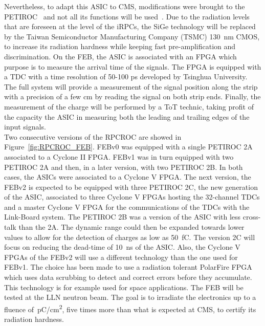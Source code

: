 	Nevertheless, to adapt this ASIC to CMS, modifications were brought to the PETIROC~\cite{PHASEIITP} and not all its functions will be used~\cite{COMBARET2018}. Due to the radiation levels that are foreseen at the level of the iRPCs, the SiGe technology will be replaced by the Taiwan Semiconductor Manufacturing Company (TSMC) \SI{130}{nm} CMOS, to increase its radiation hardness while keeping fast pre-amplification and discrimination. On the \acl{FEB}, the ASIC is associated with an FPGA which purpose is to measure the arrival time of the signals. The FPGA is equipped with a TDC with a time resolution of 50-100 \si{ps} developed by Tsinghua University. The full system will provide a measurement of the signal position along the strip with a precision of a few \si{cm} by reading the signal on both strip ends. Finally, the measurement of the charge will be performed by a \acf{ToT} technic, taking profit of the capacity the ASIC in measuring both the leading and trailing edges of the input signals.\\
	Two consecutive versions of the RPCROC are showed in Figure~\ref{fig:RPCROC_FEB}. FEBv0 was equipped with a single PETIROC 2A associated to a Cyclone II FPGA. FEBv1 was in turn equipped with two PETIROC 2A and then, in a later version, with two PETIROC 2B. In both cases, the ASICs were associated to a Cyclone V FPGA. The next version, the FEBv2 is expected to be equipped with three PETIROC 2C, the new generation of the ASIC, associated to three Cyclone V FPGAs hosting the 32-channel TDCs and a master Cyclone V FPGA for the communications of the TDCs with the Link-Board system. The PETIROC 2B was a version of the ASIC with less cross-talk than the 2A. The dynamic range could then be expanded towards lower values to allow for the detection of charges as low as \SI{50}{fC}. The version 2C will focus on reducing the dead-time of \SI{10}{ns} of the ASIC. Also, the Cyclone V FPGAs of the FEBv2 will use a different technology than the one used for FEBv1. The choice has been made to use a radiation tolerant PolarFire FPGA which uses data scrubbing to detect and correct errors before they accumulate. This technology is for example used for space applications. The FEB will be tested at the \acf{LLN} neutron beam. The goal is to irradiate the electronics up to a fluence of \,\si{pC/cm^2}, five times more than what is expected at CMS, to certify its radiation hardness.\\

